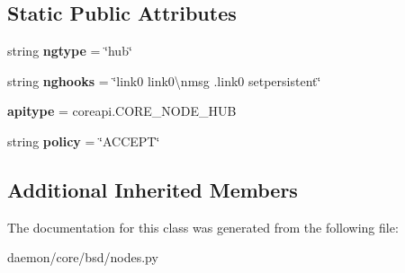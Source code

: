 \subsection*{Static Public Attributes}
\begin{DoxyCompactItemize}
\item 
\hypertarget{classcore_1_1bsd_1_1nodes_1_1_hub_node_a329bbcac404e6a2196c42c93b35c160b}{string {\bfseries ngtype} = \char`\"{}hub\char`\"{}}\label{classcore_1_1bsd_1_1nodes_1_1_hub_node_a329bbcac404e6a2196c42c93b35c160b}

\item 
\hypertarget{classcore_1_1bsd_1_1nodes_1_1_hub_node_a782dd0195f71b4c241ab0b908363c448}{string {\bfseries nghooks} = \char`\"{}link0 link0\textbackslash{}nmsg .link0 setpersistent\char`\"{}}\label{classcore_1_1bsd_1_1nodes_1_1_hub_node_a782dd0195f71b4c241ab0b908363c448}

\item 
\hypertarget{classcore_1_1bsd_1_1nodes_1_1_hub_node_a2439e17e87b91d2cef3efe97fa521c3b}{{\bfseries apitype} = coreapi.\+C\+O\+R\+E\+\_\+\+N\+O\+D\+E\+\_\+\+H\+U\+B}\label{classcore_1_1bsd_1_1nodes_1_1_hub_node_a2439e17e87b91d2cef3efe97fa521c3b}

\item 
\hypertarget{classcore_1_1bsd_1_1nodes_1_1_hub_node_ae4f99b56a294d7051b24334a6bc83d67}{string {\bfseries policy} = \char`\"{}A\+C\+C\+E\+P\+T\char`\"{}}\label{classcore_1_1bsd_1_1nodes_1_1_hub_node_ae4f99b56a294d7051b24334a6bc83d67}

\end{DoxyCompactItemize}
\subsection*{Additional Inherited Members}


The documentation for this class was generated from the following file\+:\begin{DoxyCompactItemize}
\item 
daemon/core/bsd/nodes.\+py\end{DoxyCompactItemize}
